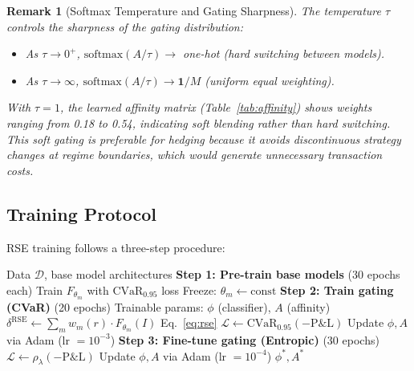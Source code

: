 \documentclass[11pt]{article}
\newtheorem{remark}[theorem]{Remark}
\newcommand{\cvar}{\mathrm{CVaR}}
\begin{document}
\begin{remark}[Softmax Temperature and Gating Sharpness]
The temperature $\tau$ controls the sharpness of the gating distribution:
\begin{itemize}[noitemsep]
    \item As $\tau \to 0^+$, $\mathrm{softmax}(A/\tau) \to$ one-hot (hard switching between models).
    \item As $\tau \to \infty$, $\mathrm{softmax}(A/\tau) \to \mathbf{1}/M$ (uniform equal weighting).
\end{itemize}
With $\tau = 1$, the learned affinity matrix (Table~\ref{tab:affinity}) shows weights ranging from 0.18 to 0.54, indicating soft blending rather than hard switching.  This soft gating is preferable for hedging because it avoids discontinuous strategy changes at regime boundaries, which would generate unnecessary transaction costs.
\end{remark}

\subsection{Training Protocol}

RSE training follows a three-step procedure:

\begin{algorithm}[t]
\caption{RSE Training Protocol}
\label{alg:rse}
\begin{algorithmic}[1]
\REQUIRE Data $\mathcal{D}$, base model architectures
\STATE \textbf{Step 1: Pre-train base models} (30 epochs each)
    \STATE Train $F_{\theta_m}$ with $\cvar_{0.95}$ loss
    \STATE Freeze: $\theta_m \gets \text{const}$
\ENDFOR
\STATE
\STATE \textbf{Step 2: Train gating (CVaR)} (20 epochs)
\STATE Trainable params: $\phi$ (classifier), $A$ (affinity)
        \STATE $\delta^{\mathrm{RSE}} \gets \sum_m w_m(r) \cdot F_{\theta_m}(I)$ \hfill Eq.~\eqref{eq:rse}
        \STATE $\mathcal{L} \gets \cvar_{0.95}(-\mathrm{P\&L})$
        \STATE Update $\phi, A$ via Adam (lr $= 10^{-3}$)
    \ENDFOR
\ENDFOR
\STATE
\STATE \textbf{Step 3: Fine-tune gating (Entropic)} (30 epochs)
        \STATE $\mathcal{L} \gets \rho_\lambda(-\mathrm{P\&L})$
        \STATE Update $\phi, A$ via Adam (lr $= 10^{-4}$)
    \ENDFOR
\ENDFOR
\RETURN $\phi^*, A^*$
\end{algorithmic}
\end{algorithm}
\end{document}
